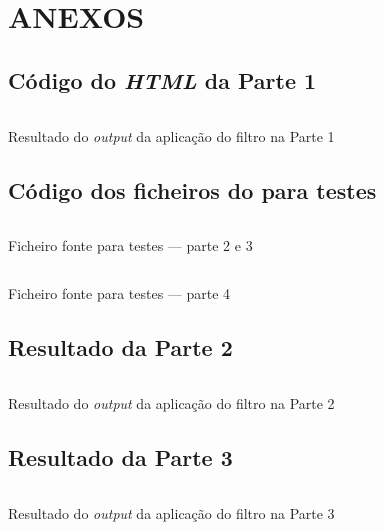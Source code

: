 \appendix

\part*{ANEXOS}

\chapter{Código do \emph{HTML} da Parte 1}
\label{appendix:a}

\begin{longlisting}
	\inputminted{html}{testes/res_html.html}
	\caption{Resultado do \emph{output} da aplicação do filtro na Parte 1}
	\label{listing:a}
\end{longlisting}


\chapter{Código dos ficheiros do  para testes}
\label{appendix:a1}

\begin{longlisting}
	\inputminted{tex}{testes/ex3.bib}
	\caption{Ficheiro fonte  para testes --- parte 2 e 3}
	\label{listing:a1}
\end{longlisting}

\begin{longlisting}
	\inputminted{tex}{testes/ex4.bib}
	\caption{Ficheiro fonte  para testes --- parte 4}
	\label{listing:a2}
\end{longlisting}

\chapter{Resultado da Parte 2}
\label{appendix:b}

\begin{longlisting}
	\inputminted{tex}{testes/resNorm.bib}
	\caption{Resultado do \emph{output} da aplicação do filtro na Parte 2}

	\label{listing:b}
\end{longlisting}

\chapter{Resultado da Parte 3}
\label{appendix:c}

\begin{longlisting}
	\inputminted{tex}{testes/res_pretty_printing.txt}
	\caption{Resultado do \emph{output} da aplicação do filtro na Parte 3}

	\label{listing:c}
\end{longlisting}

